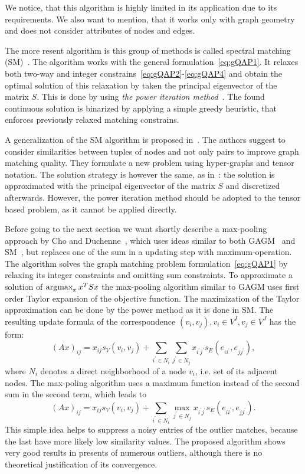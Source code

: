 We notice, that this algorithm is highly limited in its application due to its requirements. We also want to mention, that it works only with graph geometry and does not consider attributes of nodes and edges.

The more resent algorithm is this group of methods is called spectral matching (SM)~\cite{Leordeanu2005_SM}. The algorithm works with the general formulation~\eqref{eq:gQAP1}. It relaxes both two-way and integer constrains~\eqref{eq:gQAP2}-\eqref{eq:gQAP4} and obtain the optimal solution of this relaxation by taken the principal eigenvector of the matrix $S$. This is done by using \emph{the power iteration method}~\cite{PowerIteration}. The found continuous solution is binarized by applying a simple greedy heuristic, that enforces previously relaxed matching constrains.

A generalization of the SM algorithm is proposed in~\cite{Duchenne2011}. The authors suggest to consider similarities between tuples of nodes and not only pairs to improve graph matching quality. They formulate a new problem using hyper-graphs and tensor notation. The solution strategy is however the same, as in~\cite{Leordeanu2005_SM}: the solution is approximated with the principal eigenvector of the matrix $S$ and discretized afterwards. However, the power iteration method should be adopted to the tensor based problem, as it cannot be applied directly.

Before going to the next section we want shortly describe a max-pooling approach by Cho and Duchenne~\cite{Cho2014_Haystack}, which uses ideas similar to both GAGM~\cite{Rangarajan1996_GAGM} and SM~\cite{Leordeanu2005_SM}, but replaces one of the sum in a updating step with maximum-operation. The algorithm solves the graph matching problem formulation~\eqref{eq:gQAP1} by relaxing its integer constraints and omitting sum constraints. To approximate a solution of $\mathop{\rm argmax}_{x}x^TSx$ the max-pooling algorithm similar to GAGM uses first order Taylor expansion of the objective function. The maximization of the Taylor approximation can be done by the power method as it is done in SM.
The resulting update formula of the correspondence $(v_i,v_j),v_i\in V^I,v_j\in V^J$ has the form:
\begin{equation}
(Ax)_{ij}=x_{ij}s_V(v_i,v_{j})+\sum_{i^\prime\in N_i}\sum_{j^\prime\in N_j}x_{i^\prime j^\prime}s_E(e_{ii^\prime},e_{jj^\prime}),
\end{equation}
where $N_i$ denotes a direct neighborhood of a node $v_i$, i.e. set of its adjacent nodes.
The max-poling algorithm uses a maximum function instead of the second sum in the second term, which leads to
\begin{equation}
(Ax)_{ij}=x_{ij}s_V(v_i,v_{j})+\sum_{i^\prime\in N_i}\max_{j^\prime\in N_j}x_{i^\prime j^\prime}s_E(e_{ii^\prime},e_{jj^\prime}).
\end{equation}
This simple idea helps to suppress a noisy entries of the outlier matches, because the last have more likely low similarity values. The proposed algorithm shows very good results in presents of numerous outliers, although there is no theoretical justification of its convergence.
